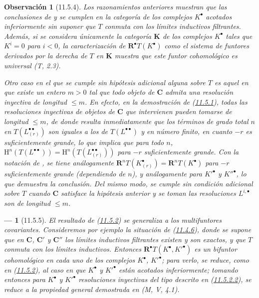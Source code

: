 \documentclass[10pt,oneside,openany]{book}
\theoremstyle{egaenv}\newtheorem*{env}{---}
\theoremstyle{egastatement}
\theoremstyle{egadescription}
\newtheorem*{remark}{Observación}
\newcommand{\oldpage}[2][]{\marginnote{\normalfont\scriptsize\textbf{#1}\,|\,#2}\ignorespaces}
\renewcommand{\leq}{\leqslant}
\begin{document}
\begin{remark}[11.5.4]
\label{0.11.5.4}
\label{0.11.5.4-fr}
Los razonamientos anteriores muestran que las conclusiones de  y  se cumplen en la categoría de los complejos $K^\bullet$ \emph{acotados inferiormente} sin suponer que $T$ conmuta con los límites inductivos filtrantes.
Además, si se considera únicamente la categoría $\boldsymbol{K}$ de los complejos $K^\bullet$ tales que $K^i=0$ para $i<0$, la caracterización de $\mathbf R^\bullet T(K^\bullet)$ como el sistema de funtores derivados por la derecha de $T$ en $\boldsymbol{K}$ muestra que este funtor cohomológico es \emph{universal} (T, 2.3).

Otro caso en el que  se cumple sin hipótesis adicional alguna sobre $T$ es aquel en que existe un entero $m>0$ tal que todo objeto de $\boldsymbol{C}$ admita una resolución inyectiva \emph{de longitud} $\leq m$. En efecto, en la demostración de (\hyperref[0.11.5.1-fr]{11.5.1}), todas las resoluciones inyectivas de objetos de $\boldsymbol{C}$ que intervienen pueden tomarse de longitud $\leq m$, de donde resulta inmediatamente que los términos de grado total $n$ en $T(L_{(r)}^{\bullet\bullet})$ son \emph{iguales a los de} $T(L^{\bullet\bullet})$ y en número \emph{finito}, en cuanto $-r$ es suficientemente grande, lo que implica que para todo $n$,
$\mathrm H^n(T(L^{\bullet\bullet}))=
\mathrm H^n(T(L_{(r)}^{\bullet\bullet}))$
para $-r$ suficientemente grande.
Con la notación de , se tiene análogamente
$\mathbf R^nT(K_{(r)}^\bullet)=\mathbf R^nT(K^\bullet)$
para $-r$ suficientemente grande (dependiendo de $n$), y análogamente para $K'^\bullet$ y $K''^\bullet$, lo que demuestra la conclusión.
Del mismo modo,  se cumple sin condición adicional sobre $T$ cuando $\boldsymbol{C}$ satisface la hipótesis anterior y se toman las resoluciones $L^{i,\bullet}$ son de longitud $\leq m$.
\end{remark}

\begin{env}[11.5.5]
\label{0.11.5.5-fr}
El resultado de (\hyperref[0.11.5.2-fr]{11.5.2}) se generaliza a los multifuntores covariantes. Consideremos por ejemplo la situación de (\hyperref[0.11.4.6-fr]{11.4.6}), donde se supone que en $\boldsymbol{C}$, $\boldsymbol{C}'$ y $\boldsymbol{C}''$
\oldpage[0\textsubscript{III}]{39}
los límites inductivos filtrantes existen y son exactos, y que $T$ conmuta con los límites inductivos. Entonces $\mathbf R^\bullet T(K^\bullet,K'^\bullet)$ es un bifuntor \emph{cohomológico} en cada uno de los complejos $K^\bullet$, $K'^\bullet$; para verlo, se reduce, como en (\hyperref[0.11.5.2-fr]{11.5.2}), al caso en que $K^\bullet$ y $K'^\bullet$ están acotados inferiormente; tomando entonces para $K^\bullet$ y $K'^\bullet$ resoluciones inyectivas del tipo descrito en (\hyperref[0.11.5.2.2-fr]{11.5.2.2}), se reduce a la propiedad general demostrada en (M, V, 4.1).
\end{env}
\end{document}
